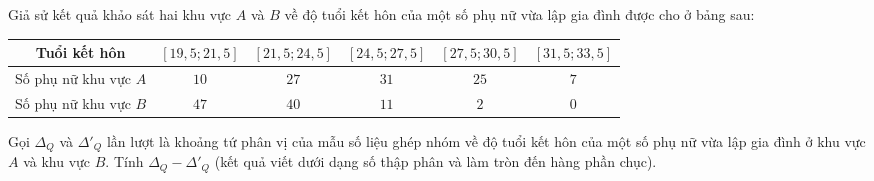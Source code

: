 \begin{ex}%
	Giả sử kết quả khảo sát hai khu vực $A$ và $B$ về độ tuổi kết hôn của một số phụ nữ vừa lập gia đình được cho ở bảng sau:
	\begin{center}
		\begin{tabular}{|c|c|c|c|c|c|}
			\hline
			Tuổi kết hôn&	$[19{,}5;21{,}5]$&	$[21{,}5;24{,}5]$&	$[24{,}5;27{,}5]$&	$[27{,}5;30{,}5]$&	$[31{,}5;33{,}5]$\\
			\hline
			Số phụ nữ khu vực $A$&	$10$&	$27$&	$31$&	$25$&	$7$\\
			\hline
			Số phụ nữ khu vực $B$&	$47$&	$40$&	$11$&	$2$&	$0$\\
			\hline
		\end{tabular}
	\end{center}
	Gọi $\Delta_Q$ và $\Delta'_Q$ lần lượt là khoảng tứ phân vị của mẫu số liệu ghép nhóm về độ tuổi kết hôn của một số phụ nữ vừa lập gia đình ở khu vực $A$ và khu vực $B$. Tính $\Delta_Q-\Delta'_Q$ (kết quả viết dưới dạng số thập phân và làm tròn đến hàng phần chục).
	

\end{ex}
